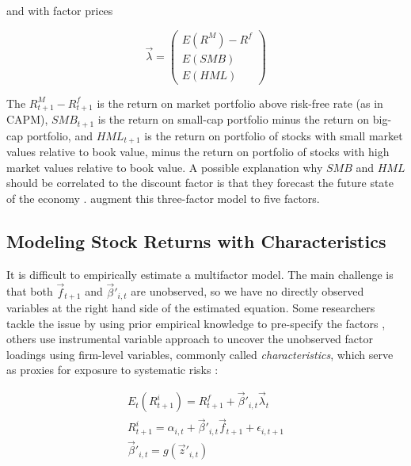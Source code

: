 			and with factor prices 
			
			\begin{equation}
			  \vec{\lambda} =
				\begin{pmatrix}
					E(R^M)-R^f \\
					E(SMB) \\
					E(HML)				
				\end{pmatrix} 
			\end{equation}
			 
			The $R^M_{t+1}-R^f_{t+1}$ is the return on market portfolio above risk-free rate (as in CAPM), $SMB_{t+1}$ is the return on small-cap portfolio minus the return on big-cap portfolio, and $HML_{t+1}$ is the return on portfolio of stocks with small market values relative to book value, minus the return on portfolio of stocks with high market values relative to book value. A possible explanation why $SMB$ and $HML$ should be correlated to the discount factor is that they forecast the future state of the economy \citep{liew2000can}.		
			\cite{fama2015five} augment this three-factor model to five factors. 
			
			
		\subsection{Modeling Stock Returns with Characteristics}
			
			It is difficult to empirically estimate a multifactor model. The main challenge is that both $\vec{f}_{t+1}$ and $\vec{\beta}'_{i,t}$ are unobserved, so we have no directly observed variables at the right hand side of the estimated equation. Some researchers tackle the issue by using prior empirical knowledge to pre-specify the factors  \citep{fama1993common, fama2015five}, others use instrumental variable approach \citep{kelly2019characteristics} to uncover the unobserved factor loadings using firm-level variables, commonly called \textit{characteristics}, which serve as proxies for exposure to systematic risks \cite{kelly2019characteristics}:  
			
			\begin{align}
				E_t(R^i_{t+1}) = R^f_{t+1} + \vec{\beta}'_{i,t} \vec{\lambda}_{t}  \label{eq:ER_betalambda} \\
				R^i_{t+1} = \alpha_{i,t} + \vec{\beta}'_{i,t} \vec{f}_{t+1} + \epsilon_{i,t+1} \\
				\vec{\beta}'_{i,t} = g(\vec{z}'_{i,t}) \label{eq:instrumented_betas}
			\end{align}
			 
